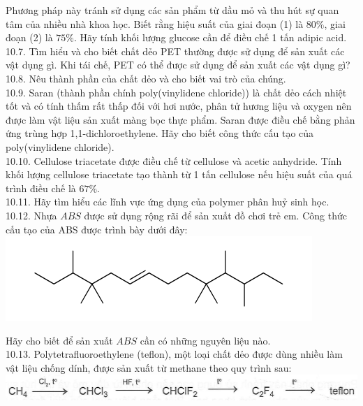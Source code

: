 \documentclass[10pt]{article}
\begin{document}
Phương pháp này tránh sử dụng các sản phẩm từ dầu mỏ và thu hút sự quan tâm của nhiều nhà khoa học. Biết rằng hiệu suất của giai đoạn (1) là $80 \%$, giai đoạn (2) là $75 \%$. Hãy tính khối lượng glucose cần để điều chế 1 tấn adipic acid.\\
10.7. Tìm hiểu và cho biết chất dẻo PET thường được sử dụng để sản xuất các vật dụng gì. Khi tái chế, PET có thể được sử dụng để sản xuất các vật dụng gì?\\
10.8. Nêu thành phần của chất dẻo và cho biết vai trò của chúng.\\
10.9. Saran (thành phần chính poly(vinylidene chloride)) là chất dẻo cách nhiệt tốt và có tính thấm rất thấp đối với hơi nước, phân tử hương liệu và oxygen nên được làm vật liệu sản xuất màng bọc thực phẩm. Saran được điều chế bằng phản ứng trùng hợp 1,1-dichloroethylene. Hãy cho biết công thức cấu tạo của poly(vinylidene chloride).\\
10.10. Cellulose triacetate được điều chế từ cellulose và acetic anhydride. Tính khối lượng cellulose triacetate tạo thành từ 1 tấn cellulose nếu hiệu suất của quá trình điều chế là $67 \%$.\\
10.11. Hãy tìm hiểu các lĩnh vực ứng dụng của polymer phân huỷ sinh học.\\
10.12. Nhựa $A B S$ được sử dụng rộng rãi để sản xuất đồ chơi trẻ em. Công thức cấu tạo của ABS được trình bày dưới đây:\\
\includegraphics{smile-c64e14e7966289bb7ecb0e0389d243e8a6d9850d}

Hãy cho biết để sản xuất $A B S$ cần có những nguyên liệu nào.\\
10.13. Polytetrafluoroethylene (teflon), một loại chất dẻo được dùng nhiều làm vật liệu chống dính, được sản xuất từ methane theo quy trình sau:\\
\includegraphics[max width=\textwidth, center]{2025_10_23_de6f5713836e4e91b3c8g-070}
\end{document}
